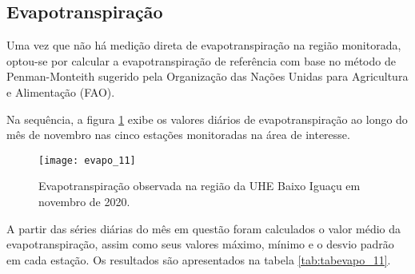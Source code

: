 \documentclass[a4paper,12pt]{article}
\begin{document}
    
    \newpage
     
                   \subsection{Evapotranspiração }
                   
                   \hspace{0.5cm} Uma vez que não há medição direta de evapotranspiração na região monitorada, optou-se por calcular a
                   evapotranspiração de referência com base no método de Penman-Monteith sugerido pela 
                   Organização das Nações Unidas para Agricultura e Alimentação (FAO). 
                   
                   Na sequência, a figura \ref{fig:figevapo_11} exibe os valores diários de evapotranspiração ao longo do mês de novembro nas cinco estações
                   monitoradas na área de interesse.
                       
    

    \begin{figure}[!htb]
    \texttt{[image: evapo\_11]}
    \caption{Evapotranspiração observada na região da UHE Baixo Iguaçu em novembro de 2020.}
    \label{fig:figevapo_11}
    \end{figure}

    A partir das séries diárias do mês em questão foram calculados o valor médio da evapotranspiração, assim como seus valores máximo, mínimo e
    o desvio padrão em cada estação. Os resultados são apresentados na tabela \ref{tab:tabevapo_11}.
    
\end{document}
